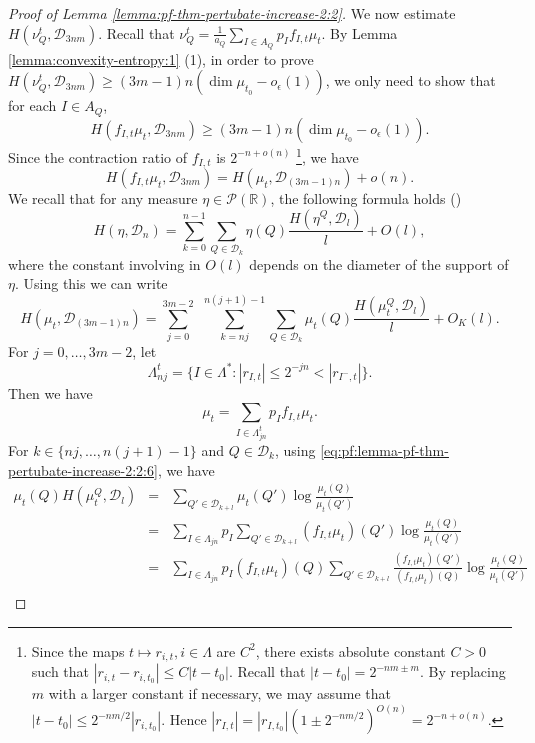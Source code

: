 \documentclass[a4paper,11pt]{amsart}
\theoremstyle{definition}
\numberwithin{equation}{section}
\def\D{\mathcal{D}}
\def\cP{\mathcal P}
\def\R{\mathbb R}
\begin{document}
\begin{proof}[Proof of Lemma \ref{lemma:pf-thm-pertubate-increase-2:2}]
 We now estimate $H(\nu_Q^t,\D_{3nm})$.  Recall that $\nu_Q^t=\frac{1}{a_Q}\sum_{I\in A_Q}p_If_{I,t}\mu_t$.  By Lemma \ref{lemma:convexity-entropy:1} (1),  in order to prove $H(\nu_Q^t,\D_{3nm})\ge (3m-1)n(\dim\mu_{t_0}-o_\epsilon(1))$, we only need to show that for each $I\in A_Q $, 
 \[
H(f_{I,t}\mu_{t},\D_{3nm})\ge (3m-1)n(\dim\mu_{t_0}-o_\epsilon(1)).
 \]
Since the contraction ratio of $f_{I,t}$ is $2^{-n+o(n)}$ \footnote{Since the maps $t\mapsto r_{i,t}, i\in \Lambda$ are $C^2$,  there exists absolute  constant $C>0$ such that $|r_{i,t}-r_{i,t_0}|\le C|t-t_0|$.  Recall that  $|t-t_0|=2^{-nm\pm m}$.   By replacing $m$ with a larger constant if necessary,  we may assume that $|t-t_0|\le 2^{-nm/2}|r_{i,t_0}|$.  Hence $|r_{I,t}|=|r_{I,t_0}|(1\pm 2^{-nm/2})^{O(n)}=2^{-n+o(n)}$.},  we have 
\begin{equation}\label{eq:pf:lemma-pf-thm-pertubate-increase-2:2:4}
H(f_{I,t}\mu_{t},\D_{3nm}) = H(\mu_{t},\D_{(3m-1)n}) +o(n). 
\end{equation}
We recall that for any measure $\eta\in \cP(\R)$,  the following formula holds (\cite[Lemma 3.4]{Hochman2014})
\[
H(\eta,\D_n)=\sum_{k=0}^{n-1}\sum_{Q\in \D_k}\eta(Q)\frac{H(\eta^Q,\D_l)}{l} +O(l),
\]
where the constant involving in $O(l)$ depends on the diameter of the support of $\eta$.  Using this we can write 
\begin{equation}\label{eq:pf:lemma-pf-thm-pertubate-increase-2:2:5}
H(\mu_t,\D_{(3m-1)n})=\sum_{j=0}^{3m-2}\ \ \sum_{k=nj}^{n(j+1)-1}\sum_{Q\in \D_k}\mu_t(Q)\frac{H(\mu_t^Q,\D_l)}{l} +O_K(l).
\end{equation}
For $j=0,\ldots,  3m-2$,  let 
\[\Lambda^t_{nj}=\{I\in \Lambda^*: |r_{I,t}|\le 2^{-jn}<|r_{I^-,t}|\}.\]
Then we have 
\begin{equation}\label{eq:pf:lemma-pf-thm-pertubate-increase-2:2:6}
\mu_t=\sum_{I\in \Lambda^t_{jn}} p_If_{I,t}\mu_t. 
\end{equation}
For $k\in \{nj,\ldots, n(j+1)-1\}$ and $Q\in \D_k$, using \eqref{eq:pf:lemma-pf-thm-pertubate-increase-2:2:6},  we have 
\begin{eqnarray}
  \mu_t(Q)H(\mu_t^Q,\D_l) & = & \sum_{Q'\in \D_{k+l}}\mu_t(Q') \log \frac{\mu_t(Q)}{\mu_t(Q')} \nonumber\\
   & = &\sum_{I\in \Lambda_{jn}}p_I\sum_{Q'\in \D_{k+l}}(f_{I,t}\mu_t)(Q')  \log \frac{\mu_t(Q)}{\mu_t(Q')} \nonumber\\
   & = & \sum_{I\in \Lambda_{jn}}p_I(f_{I,t}\mu_t)(Q)\sum_{Q'\in \D_{k+l}}\frac{(f_{I,t}\mu_t)(Q')}{(f_{I,t}\mu_t)(Q)}  \log \frac{\mu_t(Q)}{\mu_t(Q')}   \nonumber\\

\end{eqnarray}
\end{proof}
\end{document}
